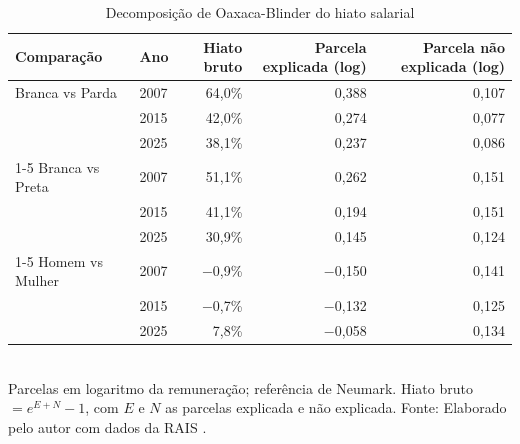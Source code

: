 \begin{table}[htbp]
    \centering
    \caption{Decomposição de Oaxaca-Blinder do hiato salarial}
    \label{tab:hiato}
    \footnotesize
    \renewcommand{\arraystretch}{1.25}
    \begin{tabular}{llrrr}
        \toprule
        \rowcolor{black!8}
        \textbf{Comparação} & \textbf{Ano} & \textbf{Hiato bruto} & \textbf{Parcela explicada (log)} & \textbf{Parcela não explicada (log)} \\
        \midrule
        Branca vs Parda & 2007 & 64,0\% & 0,388 & 0,107 \\
         & 2015 & 42,0\% & 0,274 & 0,077 \\
         & 2025 & 38,1\% & 0,237 & 0,086 \\
        \cmidrule{1-5}
        Branca vs Preta & 2007 & 51,1\% & 0,262 & 0,151 \\
         & 2015 & 41,1\% & 0,194 & 0,151 \\
         & 2025 & 30,9\% & 0,145 & 0,124 \\
        \cmidrule{1-5}
        Homem vs Mulher & 2007 & $-$0,9\% & $-$0,150 & 0,141 \\
         & 2015 & $-$0,7\% & $-$0,132 & 0,125 \\
         & 2025 & 7,8\% & $-$0,058 & 0,134 \\
        \bottomrule
    \end{tabular}
    \\[4pt]
    Parcelas em logaritmo da remuneração; referência de Neumark. Hiato bruto $= e^{E+N} - 1$, com $E$ e $N$ as parcelas explicada e não explicada. Fonte: Elaborado pelo autor com dados da RAIS \cite{RAIS2024}.
\end{table}
